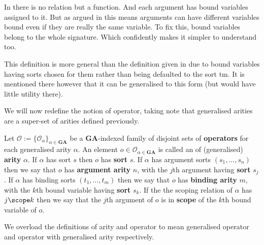 \begin{remark}
    In \cite{harper_2016} there is no relation but a function. And each argument has bound variables assigned to it. But as argued in \cite{nlab:initiality_project_-_raw_syntax} this means arguments can have different variables bound even if they are really the same variable. To fix this, bound variables belong to the whole signature. Which confidently makes it simpler to understand too.
    
    This definition is more general than the definition given in \cite{nlab:initiality_project_-_raw_syntax} due to bound variables having sorts chosen for them rather than being defaulted to the sort $\mathrm{tm}$. It is mentioned there however that it can be generalised to this form (but would have little utility there).
\end{remark}

We will now redefine the notion of operator, taking note that generalised arities are a super-set of arities defined previously.

\begin{defin}\label{owga}
    Let $\mathcal{O}:=\{ \mathcal{O}_\alpha\}_{\alpha \in \mathbf{GA}}$ be a $\mathbf{GA}$-indexed family of disjoint sets of \textbf{operators} for each generalised arity $\alpha$. An element $o \in \mathcal{O}_{\alpha \in \mathbf{GA}}$ is called an  of (generalised) \textbf{arity} $\alpha$. If $\alpha$ has sort $s$ then $o$ has \textbf{sort} $s$. If $\alpha$ has argument sorts $(s_1,\dots,s_n)$ then we say that $o$ has \textbf{argument arity} $n$, with the $j$th argument having \textbf{sort} $s_j$. If $\alpha$ has binding sorts $(t_1,\dots,t_m)$ then we say that $o$ has \textbf{binding arity} $m$, with the $k$th bound variable having \textbf{sort} $s_k$. If the the scoping relation of $\alpha$ has $j \scope k$ then we say that the $j$th argument of $o$ is in \textbf{scope} of the $k$th bound variable of $o$. 
\end{defin}

\begin{remark}
    We overload the definitions of arity and operator to mean generalised operator and operator with generalised arity respectively.
\end{remark}

